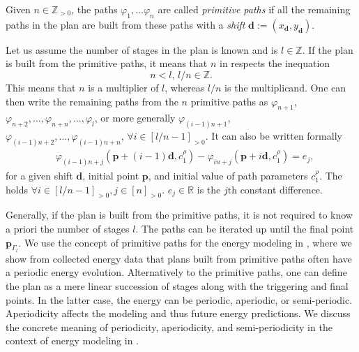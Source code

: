 \begin{defn}
  \label{def:primitive}
  Given $n\in\mathbb{Z}_{>0}$, the paths $\varphi_1,\dots\varphi_n$ are called \emph{primitive paths} if all the remaining paths in the plan are built from these paths with a \emph{shift} $\mathbf{d}:=(x_{\mathbf{d}},y_{\mathbf{d}})$. 
\end{defn}

Let us assume the number of stages in the plan is known and is $l\in\mathbb{Z}$. If the plan is built from the primitive paths, it means that $n$ in  respects the inequation
\begin{equation}
  n<l,\,l/n\in\mathbb{Z}.
\end{equation}
This means that $n$ is a multiplier of $l$, whereas $l/n$ is the multiplicand. One can then write the remaining paths from the $n$ primitive paths as $\varphi_{n+1},$ $\varphi_{n+2},\dots,\varphi_{n+n},\dots,\varphi_l$, or more generally $\varphi_{(i-1)n+1},$ $\varphi_{(i-1)n+2},\dots,\varphi_{(i-1)n+n},\,\forall i\in[l/n-1]_{>0}$. It can also be written formally
\begin{equation}\label{eq:primitive}\begin{split}
  &\varphi_{(i-1)n+j}(\mathbf{p}+(i-1)\mathbf{d},c_1^\rho)-\varphi_{in+j}(\mathbf{p}+i\mathbf{d},c_1^\rho)=e_j,
\end{split}\end{equation}
for a given shift $\mathbf{d}$, initial point $\mathbf{p}$, and initial value of path parameters $c_1^\rho$. The  holds $\forall i\in[l/n-1]_{>0},j\in[n]_{>0}$. $e_j\in\mathbb{R}$ is the $j$th constant difference.

Generally, if the plan is built from the primitive paths, it is not required to know a priori the number of stages $l$. The paths can be iterated up until the final point $\mathbf{p}_{\Gamma_l}$. We use the concept of primitive paths for the energy modeling in , where we show from collected energy data that plans built from primitive paths often have a periodic energy evolution. Alternatively to the primitive paths, one can define the plan as a mere linear succession of stages along with the triggering and final points. In the latter case, the energy can be periodic, aperiodic, or semi-periodic. Aperiodicity affects the modeling and thus future energy predictions. We discuss the concrete meaning of periodicity, aperiodicity, and semi-periodicity in the context of energy modeling in .


